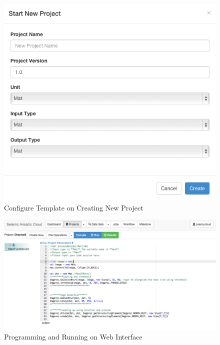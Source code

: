 \begin{figure}[h]
\centering
\includegraphics[scale=.60]{figures/NewProject.png}
\caption{Configure Template on Creating New Project}
\label{NewProject}
\end{figure}

\begin{figure}[h]
\centering
\includegraphics[scale=.35]{figures/Programming.png}
\caption{Programming and Running on Web Interface}
\label{Programming}
\end{figure}


